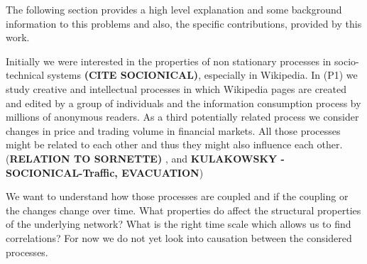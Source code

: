 \documentclass[a4paper,10pt]{scrbook}
\begin{document}
%
%


The following section provides a high level explanation and some background information to this problems and also, the specific contributions, provided by this work.
    
Initially we were interested in the properties of non stationary processes in socio-technical systems \textbf{(CITE SOCIONICAL)}, especially in Wikipedia. In (P1) we study creative and intellectual processes in which Wikipedia pages are created and edited by a group of individuals and the information consumption process by millions of anonymous readers. As a third potentially related process we consider changes in price and trading volume in financial markets. All those processes might be related to each other and thus they might also influence each other.  (\textbf{RELATION TO SORNETTE)} \cite{Crane2008}, and \textbf{KULAKOWSKY - SOCIONICAL-Traffic, EVACUATION})

We want to understand how those processes are coupled and if the coupling or the changes change over time. What properties do affect the structural properties of the underlying network? What is the right time scale which allows us to find correlations? For now we do not yet look into causation between the considered processes.
\end{document}
